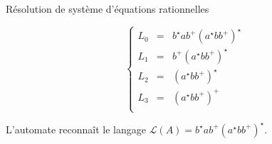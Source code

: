 \begin{frame}{Résolution de système d'équations rationnelles}
{    $$
    \left\{
    \begin{array}{rclclcl}
      L_0 &=& b^\star a b^+ (a^\star bb^+)^\star\\
      L_1 &=& b^+ (a^\star bb^+)^\star \\
      L_2 &=& (a^\star bb^+)^\star \\
      L_3 &=& (a^\star bb^+)^+\\
    \end{array}
    \right.
    $$

    \alert{L'automate reconnaît le langage $\mathcal{L}(A) = b^\star a b^+ (a^\star bb^+)^\star$.}
  }
\end{frame}
\endgroup
